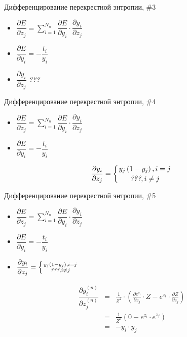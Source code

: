 \documentclass[10pt]{beamer}
\begin{document}
\begin{frame}{Дифференцирование перекрестной энтропии, \#3}

\begin{itemize}
	\item $\dfrac{\partial E}{\partial z_j} = \sum_{i = 1}^{N_{n}} \dfrac{\partial E}{\partial y_i} \cdot \dfrac{\partial y_i}{\partial z_j}$
	\item $\dfrac{\partial E}{\partial y_i} = -\dfrac{t_i}{y_i}$
	\item $\dfrac{\partial y_i}{\partial z_j}$ \textit{???}
\end{itemize}

\end{frame}


\begin{frame}{Дифференцирование перекрестной энтропии, \#4}

\begin{itemize}
	\item $\dfrac{\partial E}{\partial z_j} = \sum_{i = 1}^{N_{n}} \dfrac{\partial E}{\partial y_i} \cdot \dfrac{\partial y_i}{\partial z_j}$
	\item $\dfrac{\partial E}{\partial y_i} = -\dfrac{t_i}{y_i}$
\end{itemize}

\begin{equation*}
\dfrac{\partial y_i}{\partial z_j} = \left\{ { y_j\left( 1 - y_j \right), i = j \atop\textit{???}, i \neq j} \right.
\end{equation*}

\end{frame}


\begin{frame}{Дифференцирование перекрестной энтропии, \#5}

\begin{itemize}
	\item $\dfrac{\partial E}{\partial z_j} = \sum_{i = 1}^{N_{n}} \dfrac{\partial E}{\partial y_i} \cdot \dfrac{\partial y_i}{\partial z_j}$
	\item $\dfrac{\partial E}{\partial y_i} = -\dfrac{t_i}{y_i}$
	\item $\dfrac{\partial y_i}{\partial z_j} = \left\{ { y_j\left( 1 - y_j \right), i = j \atop\textit{???}, i \neq j} \right.$
\end{itemize}

\begin{eqnarray*}
\dfrac{\partial y^{(n)}_i}{\partial z^{(n)}_j} &=& \frac{1}{Z^2} \cdot \left( \frac{\partial e^{z_i}}{\partial z_j}\cdot Z - e^{z_i}\cdot \frac{\partial Z}{\partial z_j}\right) \\
&=& \frac{1}{Z^2} \left( 0 - e^{z_i}\cdot e^{z_j} \right) \\
&=& -y_i\cdot y_j
\end{eqnarray*}

\end{frame}
\end{document}
